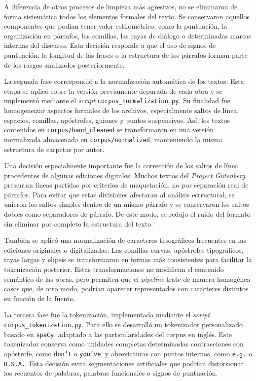 \documentclass[IB]{TFUOC}%
\begin{document}
A diferencia de otros procesos de limpieza más agresivos, no se eliminaron de forma sistemática todos los elementos formales del texto. Se conservaron aquellos componentes que podían tener valor estilométrico, como la puntuación, la organización en párrafos, las comillas, las rayas de diálogo o determinadas marcas internas del discurso. Esta decisión responde a que el uso de signos de puntuación, la longitud de las frases o la estructura de los párrafos forman parte de los rasgos analizados posteriormente.

La segunda fase correspondió a la normalización automática de los textos. Esta etapa se aplicó sobre la versión previamente depurada de cada obra y se implementó mediante el \textit{script} \texttt{corpus\_normalization.py}. Su finalidad fue homogeneizar aspectos formales de los archivos, especialmente saltos de línea, espacios, comillas, apóstrofes, guiones y puntos suspensivos. Así, los textos contenidos en \texttt{corpus/hand\_cleaned} se transformaron en una versión normalizada almacenada en \texttt{corpus/normalized}, manteniendo la misma estructura de carpetas por autor.

Una decisión especialmente importante fue la corrección de los saltos de línea procedentes de algunas ediciones digitales. Muchos textos del \textit{Project Gutenberg} presentan líneas partidas por criterios de maquetación, no por separación real de párrafos. Para evitar que estas divisiones afectaran al análisis estructural, se unieron los saltos simples dentro de un mismo párrafo y se conservaron los saltos dobles como separadores de párrafo. De este modo, se redujo el ruido del formato sin eliminar por completo la estructura del texto.

También se aplicó una normalización de caracteres tipográficos frecuentes en las ediciones originales o digitalizadas. Las comillas curvas, apóstrofes tipográficos, rayas largas y elipsis se transformaron en formas más consistentes para facilitar la tokenización posterior. Estas transformaciones no modifican el contenido semántico de las obras, pero permiten que el \textit{pipeline} trate de manera homogénea casos que, de otro modo, podrían aparecer representados con caracteres distintos en función de la fuente.

La tercera fase fue la tokenización, implementada mediante el \textit{script} \texttt{corpus\_tokenization.py}. Para ello se desarrolló un tokenizador personalizado basado en \texttt{spaCy}\cite{spacy2026}, adaptado a las particularidades del corpus en inglés. Este tokenizador conserva como unidades completas determinadas contracciones con apóstrofe, como \texttt{don't} o \texttt{you've}, y abreviaturas con puntos internos, como \texttt{e.g.} o \texttt{U.S.A.}. Esta decisión evita segmentaciones artificiales que podrían distorsionar los recuentos de palabras, palabras funcionales o signos de puntuación.
\end{document}

